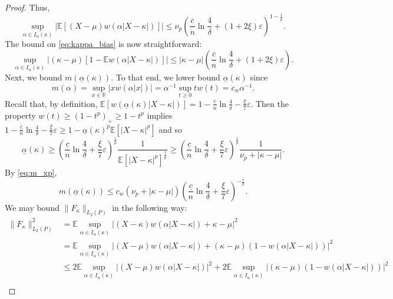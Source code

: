 \documentclass{article}
\theoremstyle{plain}
\theoremstyle{definition}
\def\R{\mathbb{R}} %
\def\eps{\varepsilon}
\newcommand{\E}{\mathbb{E}} %
\begin{document}
\begin{appendix}
{\begin{proof}
		Thus,
    \[ \sup_{\alpha\in I_\alpha(\kappa)}\lvert  \E[(X-\mu)w(\alpha \lvert X-\kappa \rvert )]\rvert 
			\leq\nu_p \left(\frac{\overline{c} }{n}\ln\frac{4}{\delta }+(1+2\xi )\eps \right)^{1-\frac{1}{p}}. \]
		The bound on \eqref{eq:kappa_bias} is now straightforward:
    \[ \sup_{\alpha\in I_\alpha(\kappa)}\lvert  (\kappa-\mu)[1-\E w(\alpha |X-\kappa|)]\rvert  \leq |\kappa - \mu| \left(\frac{\overline{c} }{n}\ln\frac{4}{\delta }+(1+2\xi )\eps\right) . \]
		Next, we bound $m(\underline{\alpha}(\kappa))$. To that end, we lower bound $\underline{\alpha}(\kappa)$ since
		\begin{equation}\label{eq:m_xp}
      m(\alpha)=\sup_{x\in\R}\lvert  xw(\alpha \lvert  x\rvert )\rvert =\alpha^{-1}\sup_{t\geq0}tw(t)=c_w\alpha^{-1}.
		\end{equation}
    Recall that, by definition, $\E[w(\underline{\alpha}(\kappa)\lvert  X-\kappa\rvert )]=1-\frac{\underline{c}}{n}\ln\frac{4}{\delta }-\frac{\xi}{7}\varepsilon $. Then the property $w(t)\geq(1-t^p)_+\geq1-t^p$ implies $1-\frac{\underline{c}}{n}\ln\frac{4}{\delta }-\frac{\xi}{7}\varepsilon \geq 1-\underline{\alpha}(\kappa)^p\E[\lvert  X-\kappa\rvert ^p]$ and so
		\begin{equation*}
      \underline{\alpha}(\kappa)\geq\left(\frac{\underline{c}}{n}\ln\frac{4}{\delta }+\frac{\xi}{7}\varepsilon \right)^{\frac{1}{p}}\frac{1}{\E[\lvert  X-\kappa\rvert ^p]^{\frac{1}{p}}}\geq\left(\frac{\underline{c} }{n}\ln\frac{4}{\delta }+\frac{\xi}{7}\varepsilon \right)^{\frac{1}{p}}\frac{1}{\nu_p+|\kappa-\mu|}.
		\end{equation*}
		By \eqref{eq:m_xp},
		\begin{equation}\label{eq:malpha_bound}
      m(\underline{\alpha}(\kappa))\leq c_w (\nu_p+\lvert  \kappa-\mu\rvert )\left(\frac{\underline{c} }{n}\ln\frac{4}{\delta }+\frac{\xi}{7}\varepsilon \right)^{-\frac{1}{p}}.
		\end{equation}
		We may bound $\lVert  F_\kappa\rVert_{L_2(P)}$ in the following way:
		\begin{align*}
      \lVert  F_\kappa\rVert^2_{L_2(P)} & =\E\sup_{\alpha\in I_\alpha (\kappa )}\lvert  (X-\kappa)w(\alpha \lvert  X-\kappa\rvert )+\kappa-\mu\rvert ^2\nonumber \\
                                           & =\E\sup_{\alpha\in I_\alpha (\kappa )}\lvert  (X-\mu)w(\alpha |X-\kappa|)+(\kappa-\mu)(1-w(\alpha |X-\kappa|))\rvert ^2\nonumber \\
                                           & \leq 2\E\sup_{\alpha\in I_\alpha (\kappa )}\lvert  (X-\mu)w(\alpha |X-\kappa|)\rvert ^2+2\E\sup_{\alpha\in I_\alpha (\kappa )}\lvert  (\kappa-\mu)(1-w(\alpha |X-\kappa|))\rvert ^2\nonumber \\

\end{align*}
\end{proof}}
\end{appendix}
\end{document}
